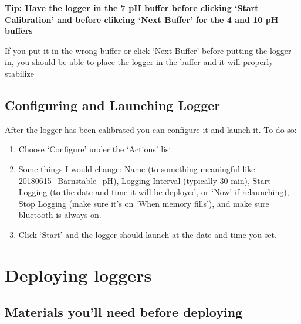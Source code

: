 \documentclass[
  letterpaper,
  DIV=11,
  numbers=noendperiod]{scrreprt}
\begin{document}
\textbf{Tip: Have the logger in the 7 pH buffer before clicking `Start
Calibration' and before clikcing `Next Buffer' for the 4 and 10 pH
buffers}

If you put it in the wrong buffer or click `Next Buffer' before putting
the logger in, you should be able to place the logger in the buffer and
it will properly stabilize

\hypertarget{configuring-and-launching-logger}{%
\subsection*{\texorpdfstring{\textbf{Configuring and Launching
Logger}}{Configuring and Launching Logger}}\label{configuring-and-launching-logger}}

After the logger has been calibrated you can configure it and launch it.
To do so:

\begin{enumerate}
\def\labelenumi{\arabic{enumi}.}
\item
  Choose `Configure' under the `Actions' list
\item
  Some things I would change: Name (to something meaningful like
  20180615\_Barnstable\_pH), Logging Interval (typically 30 min), Start
  Logging (to the date and time it will be deployed, or `Now' if
  relaunching), Stop Logging (make sure it's on `When memory fills'),
  and make sure bluetooth is always on.
\item
  Click `Start' and the logger should launch at the date and time you
  set.
\end{enumerate}

\hypertarget{deploying-loggers-1}{%
\section*{\texorpdfstring{\textbf{Deploying
loggers}}{Deploying loggers}}\label{deploying-loggers-1}}

\hypertarget{materials-youll-need-before-deploying-1}{%
\subsection*{\texorpdfstring{\textbf{Materials you'll need before
deploying}}{Materials you'll need before deploying}}\label{materials-youll-need-before-deploying-1}}
\end{document}
